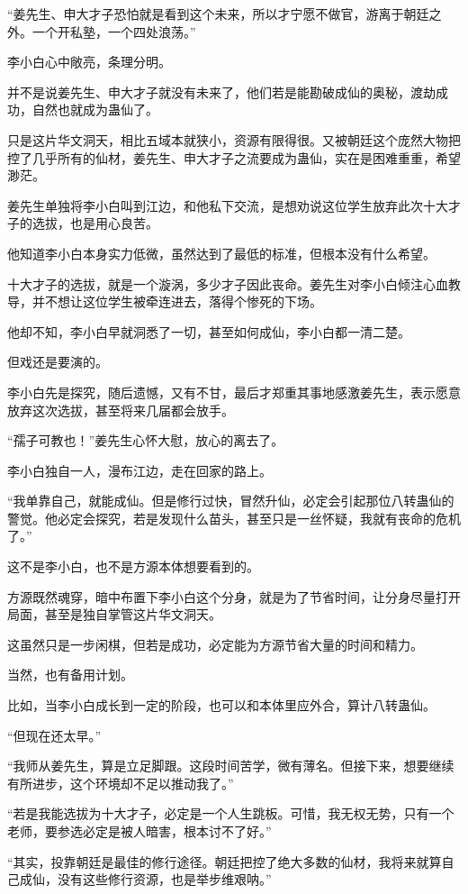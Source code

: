 \begin{this_body}
“姜先生、申大才子恐怕就是看到这个未来，所以才宁愿不做官，游离于朝廷之外。一个开私塾，一个四处浪荡。”

李小白心中敞亮，条理分明。

并不是说姜先生、申大才子就没有未来了，他们若是能勘破成仙的奥秘，渡劫成功，自然也就成为蛊仙了。

只是这片华文洞天，相比五域本就狭小，资源有限得很。又被朝廷这个庞然大物把控了几乎所有的仙材，姜先生、申大才子之流要成为蛊仙，实在是困难重重，希望渺茫。

姜先生单独将李小白叫到江边，和他私下交流，是想劝说这位学生放弃此次十大才子的选拔，也是用心良苦。

他知道李小白本身实力低微，虽然达到了最低的标准，但根本没有什么希望。

十大才子的选拔，就是一个漩涡，多少才子因此丧命。姜先生对李小白倾注心血教导，并不想让这位学生被牵连进去，落得个惨死的下场。

他却不知，李小白早就洞悉了一切，甚至如何成仙，李小白都一清二楚。

但戏还是要演的。

李小白先是探究，随后遗憾，又有不甘，最后才郑重其事地感激姜先生，表示愿意放弃这次选拔，甚至将来几届都会放手。

“孺子可教也！”姜先生心怀大慰，放心的离去了。

李小白独自一人，漫布江边，走在回家的路上。

“我单靠自己，就能成仙。但是修行过快，冒然升仙，必定会引起那位八转蛊仙的警觉。他必定会探究，若是发现什么苗头，甚至只是一丝怀疑，我就有丧命的危机了。”

这不是李小白，也不是方源本体想要看到的。

方源既然魂穿，暗中布置下李小白这个分身，就是为了节省时间，让分身尽量打开局面，甚至是独自掌管这片华文洞天。

这虽然只是一步闲棋，但若是成功，必定能为方源节省大量的时间和精力。

当然，也有备用计划。

比如，当李小白成长到一定的阶段，也可以和本体里应外合，算计八转蛊仙。

“但现在还太早。”

“我师从姜先生，算是立足脚跟。这段时间苦学，微有薄名。但接下来，想要继续有所进步，这个环境却不足以推动我了。”

“若是我能选拔为十大才子，必定是一个人生跳板。可惜，我无权无势，只有一个老师，要参选必定是被人暗害，根本讨不了好。”

“其实，投靠朝廷是最佳的修行途径。朝廷把控了绝大多数的仙材，我将来就算自己成仙，没有这些修行资源，也是举步维艰呐。”


\end{this_body}
